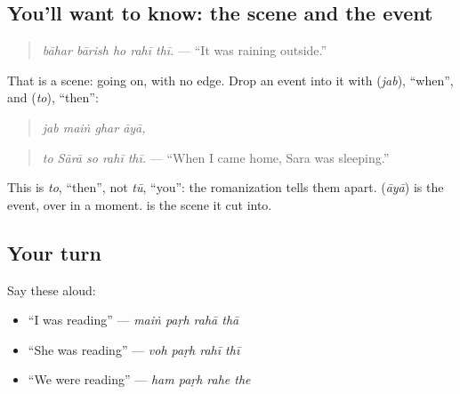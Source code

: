 \subsection*{You'll want to know: the scene and the event}
\begin{quote}
\textbf{    }
\end{quote}

\begin{quote}
\emph{bāhar bārish ho rahī thī.} — \textquotedblleft{}It was raining outside.\textquotedblright{}
\end{quote}

That is a scene: going on, with no edge. Drop an event into it with \textbf{} (\emph{jab}), \textquotedblleft{}when\textquotedblright{}, and \textbf{} (\emph{to}), \textquotedblleft{}then\textquotedblright{}:

\begin{quote}
\textbf{   }
\end{quote}

\begin{quote}
\emph{jab maiṅ ghar āyā,}
\end{quote}

\begin{quote}
\textbf{    }
\end{quote}

\begin{quote}
\emph{to Sārā so rahī thī.} — \textquotedblleft{}When I came home, Sara was sleeping.\textquotedblright{}
\end{quote}

This \textbf{} is \emph{to}, \textquotedblleft{}then\textquotedblright{}, not \textbf{} \emph{tū}, \textquotedblleft{}you\textquotedblright{}: the romanization tells them apart. \textbf{} (\emph{āyā}) is the event, over in a moment. \textbf{  } is the scene it cut into.

\subsection*{Your turn}
Say these aloud:

\begin{itemize}
\raggedright
  \item \textquotedblleft{}I was reading\textquotedblright{} — \emph{maiṅ paṛh rahā thā}
  \item \textquotedblleft{}She was reading\textquotedblright{} — \emph{voh paṛh rahī thī}
  \item \textquotedblleft{}We were reading\textquotedblright{} — \emph{ham paṛh rahe the}
\end{itemize}

